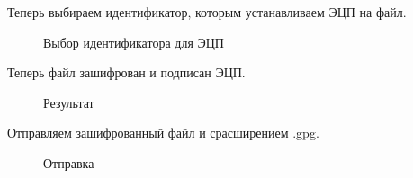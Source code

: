 \documentclass[10pt,a4paper]{report}
\begin{document}
Теперь выбираем идентификатор, которым устанавливаем ЭЦП на файл.
\begin{figure}[h]	
\caption{Выбор идентификатора для ЭЦП}
\label{ris:image11}
\end{figure}

Теперь файл зашифрован и подписан ЭЦП.
\begin{figure}[h]	
\caption{Результат}
\label{ris:image12}
\end{figure}

Отправляем зашифрованный файл и срасширением .gpg.
\begin{figure}[h]	
\caption{Отправка}
\label{ris:image13}
\end{figure}
\end{document}
